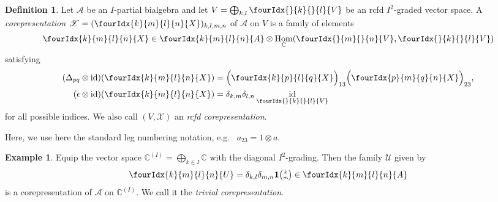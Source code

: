 \documentclass[10pt]{article}
\DeclareMathOperator{\id}{id}
\DeclareMathOperator{\Hom}{Hom}
\newcommand{\C}{\mathbb{C}}
\newcommand{\Grt}[3]{#1{\tiny {\begin{pmatrix} #2\\#3\end{pmatrix}}}}
\newcommand{\UnitC}[2]{\Grt{\mathbf{1}}{#1}{#2}}
\newcommand{\Gr}[5]{\fourIdx{#2}{#4}{#3}{#5}{#1}}%
\newcommand{\Gru}[3]{\Gr{#1}{}{}{#2}{#3}}
\theoremstyle{definition}
\newtheorem{Def}[Theorem]{Definition}
\newtheorem{Exa}[Theorem]{Example}
\numberwithin{equation}{section}
\begin{document}
\begin{Def} \label{definition:corep} Let $\mathscr{A}$ be an
  $I$-partial bialgebra and let $V=\bigoplus_{k,l} \Gru{V}{k}{l}$
   be
an rcfd $I^{2}$-graded vector space.  A \emph{corepresentation}
  $\mathscr{X}=(\Gr{X}{k}{l}{m}{n})_{k,l,m,n}$ of $\mathscr{A}$ on $V$
  is a family of elements
 \begin{align} \label{eq:rep-blocks}
   \Gr{X}{k}{l}{m}{n} \in \Gr{A}{k}{l}{m}{n} \otimes
  \Hom_\C(\Gru{V}{m}{n},\Gru{V}{k}{l})
 \end{align}
 satisfying 
 \begin{align}
   \label{eq:rep-comultiplication}
    (\Delta_{pq} \otimes
    \id)(\Gr{X}{k}{l}{m}{n}) &=
    \Big{(}\Gr{X}{k}{l}{p}{q}\Big{)}_{13}\Big{(}\Gr{X}{p}{q}{m}{n}\Big{)}_{23},
    \\ \label{eq:rep-counit}
(\epsilon \otimes
  \id)(\Gr{X}{k}{l}{m}{n})&=\delta_{k,m}\delta_{l,n}\id_{\Gru{V}{k}{l}}
 \end{align}
  for all possible indices. We also call $(V,\mathscr{X})$ an
  \emph{rcfd corepresentation}.
\end{Def}
Here, we use here the standard leg numbering notation, e.g.~ $a_{23}=1\otimes a$.
\begin{Exa} \label{example:rep-triv} Equip the vector space
  $\C^{(I)}=\bigoplus_{k\in I} \C$ with the diagonal
  $I^{2}$-grading. Then the family $\mathscr{U}$ given by
  \begin{align} \label{eq:rep-triv}
    \Gr{U}{k}{l}{m}{n} = \delta_{k,l}\delta_{m,n} \UnitC{k}{m} \in
    \Gr{A}{k}{l}{m}{n}
  \end{align}
is a corepresentation of $\mathscr{A}$ on $\C^{(I)}$. We call it the
\emph{trivial corepresentation}.
\end{Exa}
\end{document}
